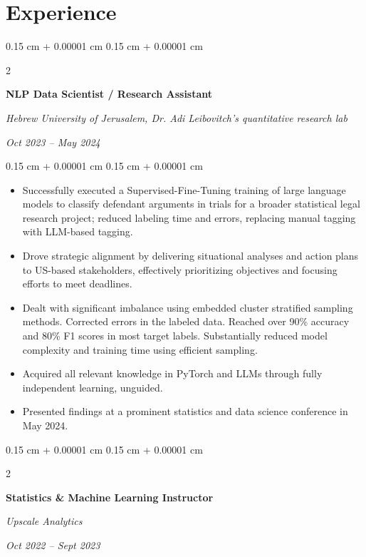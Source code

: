 \documentclass[10pt, letterpaper]{article}
\newenvironment{highlights}{
    \begin{itemize}[
        topsep=0.08 cm,
        parsep=0.08 cm,
        partopsep=0pt,
        itemsep=0pt,
        leftmargin=0.25 cm + 10pt
    ]
}{
    \end{itemize}
} %
\newenvironment{onecolentry}{
    \begin{adjustwidth}{
        0.15 cm + 0.00001 cm
    }{
        0.15 cm + 0.00001 cm
    }
}{
    \end{adjustwidth}
} %
\newenvironment{twocolentry}[2][]{
    \onecolentry
    \def\secondColumn{#2}
    \setcolumnwidth{\fill, 4 cm}
    \begin{paracol}{2}
}{
    \switchcolumn \raggedleft \secondColumn
    \end{paracol}
    \endonecolentry
} %
\begin{document}
    \section{Experience}



        
        \begin{twocolentry}{
            
            
        \textit{Oct 2023 – May 2024}}
            \textbf{NLP Data Scientist / Research Assistant}
            
            \textit{Hebrew University of Jerusalem, Dr. Adi Leibovitch's quantitative research lab}
        \end{twocolentry}

        \vspace{0.08 cm}
        \begin{onecolentry}
            \begin{highlights}
                \item Successfully executed a Supervised-Fine-Tuning training of large language models to classify defendant arguments in trials for a broader statistical legal research project; reduced labeling time and errors, replacing manual tagging with LLM-based tagging.
                \item Drove strategic alignment by delivering situational analyses and action plans to US-based stakeholders, effectively prioritizing objectives and focusing efforts to meet deadlines.
                \item Dealt with significant imbalance using embedded cluster stratified sampling methods. Corrected errors in the labeled data. Reached over 90\% accuracy and 80\% F1 scores in most target labels. Substantially reduced model complexity and training time using efficient sampling.
                \item Acquired all relevant knowledge in PyTorch and LLMs through fully independent learning, unguided.
                \item Presented findings at a prominent statistics and data science conference in May 2024.
            \end{highlights}
        \end{onecolentry}


        \vspace{0.15 cm}

        \begin{twocolentry}{
            
            
        \textit{Oct 2022 – Sept 2023}}
            \textbf{Statistics \& Machine Learning Instructor}
            
            \textit{Upscale Analytics}
        \end{twocolentry}
\end{document}
